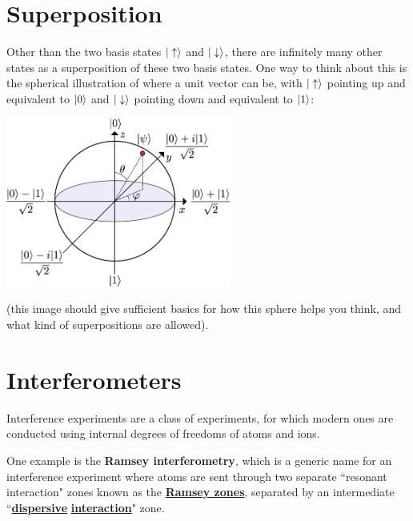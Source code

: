 \documentclass[12pt]{article}
\begin{document}
\section{Superposition}
Other than the two basis states $\Ket{\uparrow}$ and $\Ket{\downarrow}$, there are infinitely many other states as a superposition of these two basis states. One way to think about this is the spherical illustration of where a unit vector can be, with $\Ket{\uparrow}$ pointing up and equivalent to $\Ket{0}$ and $\Ket{\downarrow}$ pointing down and equivalent to $\Ket{1}$:
\begin{center}
    \includegraphics[width = 20em]{images/2.jpg}
\end{center}
(this image should give sufficient basics for how this sphere helps you think, and what kind of superpositions are allowed).

\section{Interferometers}
\begin{definition}
Interference experiments are a class of experiments, for which modern ones are conducted using internal degrees of freedoms of atoms and ions.

One example is the \textbf{Ramsey interferometry}, which is a generic name for an interference experiment where atoms are sent through two separate ``resonant interaction" zones known as the \textbf{\underline{Ramsey zones}}, separated by an intermediate ``\textbf{\underline{dispersive}} \textbf{\underline{interaction}}" zone.
\end{definition}
\end{document}
